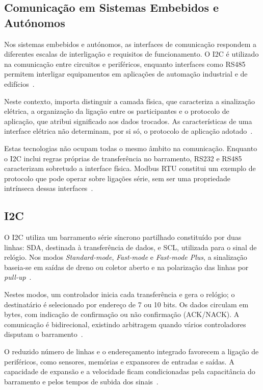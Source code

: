 \subsection{Comunicação em Sistemas Embebidos e Autónomos}

Nos sistemas embebidos e autónomos, as interfaces de comunicação respondem
a diferentes escalas de interligação e requisitos de funcionamento. O I2C
é utilizado na comunicação entre circuitos e periféricos, enquanto
interfaces como RS485 permitem interligar equipamentos em aplicações de
automação industrial e de
edifícios~\cite{nxp_um10204_2021,stiller_rs485_2015}.

Neste contexto, importa distinguir a camada física, que caracteriza a
sinalização elétrica, a organização da ligação entre os participantes e
o protocolo de aplicação, que atribui significado aos dados trocados.
As características de uma interface elétrica não determinam, por si só,
o protocolo de aplicação
adotado~\cite{dodson_rs232_2023,stiller_rs485_2015}.    

Estas tecnologias não ocupam todas o mesmo âmbito na comunicação.
Enquanto o I2C inclui regras próprias de transferência no barramento,
RS232 e RS485 caracterizam sobretudo a interface física. Modbus RTU
constitui um exemplo de protocolo que pode operar sobre ligações série,
sem ser uma propriedade intrínseca dessas
interfaces~\cite{nxp_um10204_2021,modbus_serial_2006}.

\subsection{I2C}

O I2C utiliza um barramento série síncrono partilhado constituído por duas
linhas: SDA, destinada à transferência de dados, e SCL, utilizada para o
sinal de relógio. Nos modos \textit{Standard-mode}, \textit{Fast-mode} e
\textit{Fast-mode Plus}, a sinalização baseia-se em saídas de dreno ou
coletor aberto e na polarização das linhas por
\textit{pull-up}~\cite[sec.~3.1]{nxp_um10204_2021}.

Nestes modos, um controlador inicia cada transferência e gera o relógio;
o destinatário é selecionado por endereço de 7 ou 10 bits. Os dados circulam em bytes,
com indicação de confirmação ou não confirmação (ACK/NACK). A comunicação
é bidirecional, existindo arbitragem quando vários controladores disputam
o barramento~\cite[secs.~3.1.5--3.1.11]{nxp_um10204_2021}.

O reduzido número de linhas e o endereçamento integrado favorecem a
ligação de periféricos, como sensores, memórias e expansores de entradas
e saídas. A capacidade de expansão e a velocidade ficam condicionadas
pela capacitância do barramento e pelos tempos de subida dos
sinais~\cite[secs.~2 e~7]{nxp_um10204_2021}.

